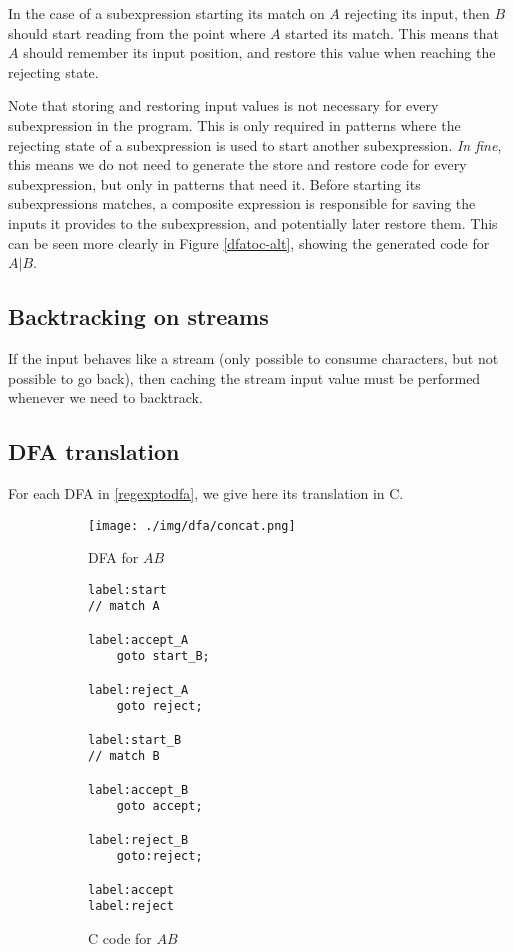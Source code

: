 \documentclass[11pt,a4paper]{report}
\newcommand{\regexp}[1]{$#1$}
\begin{document}
In the case of a subexpression starting its match on $A$ rejecting its input, then $B$ should start reading from the point where $A$ started its match. This means that $A$ should remember its input position, and restore this value when reaching the rejecting state.

Note that storing and restoring input values is not necessary for every subexpression in the program. This is only required in patterns where the rejecting state of a subexpression is used to start another subexpression. \textit{In fine}, this means we do not need to generate the store and restore code for every subexpression, but only in patterns that need it. Before starting its subexpressions matches, a composite expression is responsible for saving the inputs it provides to the subexpression, and potentially later restore them. This can be seen more clearly in Figure \ref{dfatoc-alt}, showing the generated code for \regexp{A|B}.

\subsection{Backtracking on streams}

If the input behaves like a stream (only possible to consume characters, but not possible to go back), then caching the stream input value must be performed whenever we need to backtrack.

\subsection{DFA translation}

For each DFA in \ref{regexptodfa}, we give here its translation in C.

\begin{figure}[h!]
	\begin{subfigure}[h]{0.45\textwidth}
		\centering
		\texttt{[image: ./img/dfa/concat.png]}
		\caption{DFA for \regexp{AB}}
	\end{subfigure}
	\hspace{0.05\textwidth}
	\begin{subfigure}[h]{0.45\textwidth}
		\centering
		\begin{lstlisting}[style=C]
label:start
// match A

label:accept_A
	goto start_B;

label:reject_A
	goto reject;

label:start_B
// match B

label:accept_B
	goto accept;

label:reject_B
	goto:reject;

label:accept
label:reject
		\end{lstlisting}
		\caption{C code for \regexp{AB}}
	\end{subfigure}
	\caption{}
\end{figure}
\end{document}

